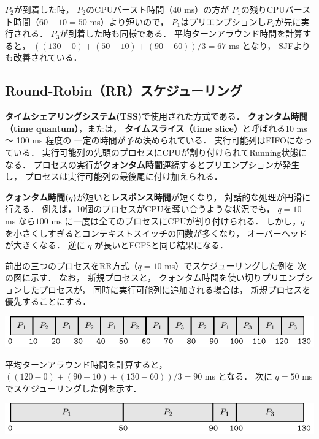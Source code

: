 $P_2$が到着した時，
$P_2$のCPUバースト時間（$40$ ms）の方が
$P_1$の残りCPUバースト時間（$60 - 10 = 50$ ms）より短いので，
$P_1$はプリエンプションし$P_2$が先に実行される．
$P_3$が到着した時も同様である．
平均ターンアラウンド時間を計算すると，
$((130-0)+(50-10)+(90-60))/3=67$ ms となり，
SJFよりも改善されている．

\subsection{Round-Robin（RR）スケジューリング}
{\bf タイムシェアリングシステム(TSS)}で使用された方式である．
{\bf クォンタム時間（time quantum）}，または，
{\bf タイムスライス（time slice）}と呼ばれる10 ms 〜 100 ms 程度の
一定の時間が予め決められている．
実行可能列はFIFOになっている．
実行可能列の先頭のプロセスにCPUが割り付けられてRunning状態になる．
プロセスの実行が{\bf クォンタム時間}連続するとプリエンプションが発生し，
プロセスは実行可能列の最後尾に付け加えられる．

{\bf クォンタム時間($q$)}が短いと{\bf レスポンス時間}が短くなり，
対話的な処理が円滑に行える．
例えば，10個のプロセスがCPUを奪い合うような状況でも，
$q = 10$ ms なら$100$ ms に一度は全てのプロセスにCPUが割り付けられる．
しかし，$q$ を小さくしすぎるとコンテキストスイッチの回数が多くなり，
オーバーヘッドが大きくなる．
逆に $q$ が長いとFCFSと同じ結果になる．

前出の三つのプロセスをRR方式（$q = 10$ ms）でスケジューリングした例を
次の図に示す．
なお，
新規プロセスと，
クォンタム時間を使い切りプリエンプションしたプロセスが，
同時に実行可能列に追加される場合は，
新規プロセスを優先することにする．

\begin{center}
\includegraphics[scale=1.0]{Tbl/rr1.pdf}
\end{center}

平均ターンアラウンド時間を計算すると，
$((120-0)+(90-10)+(130-60))/3=90$ ms となる．
次に $q = 50$ ms でスケジューリングした例を示す．

\begin{center}
\includegraphics[scale=1.0]{Tbl/rr2.pdf}
\end{center}

